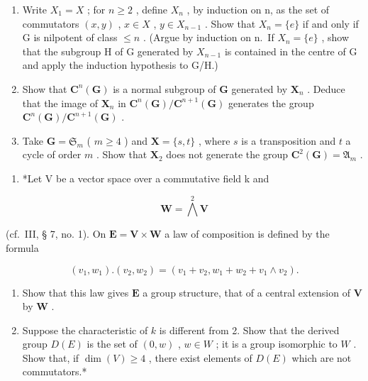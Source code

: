 \begin{enumerate}
\def\labelenumi{(\alph{enumi})}
\item
  Write \(X_{1} = X\) ; for \(n \geqslant 2\) , define \(X_{n}\) , by induction on n, as the set of commutators \((x, y)\) , \(x \in X\) , \(y \in X_{n-1}\) . Show that \(X_{n} = \{e\}\) if and only if G is nilpotent of class \(\leqslant n\) . (Argue by induction on n.~If \(X_{n} = \{e\}\) , show that the subgroup H of G generated by \(X_{n-1}\) is contained in the centre of G and apply the induction hypothesis to G/H.)
\item
  Show that \(\mathbf{C}^n (\mathbf{G})\) is a normal subgroup of \(\mathbf{G}\) generated by \(\mathbf{X}_n\) . Deduce that the image of \(\mathbf{X}_n\) in \(\mathbf{C}^n (\mathbf{G}) / \mathbf{C}^{n + 1}(\mathbf{G})\) generates the group \(\mathbf{C}^n (\mathbf{G}) / \mathbf{C}^{n + 1}(\mathbf{G})\) .
\item
  Take \(\mathbf{G} = \mathfrak{S}_m\) ( \(m \geqslant 4\) ) and \(\mathbf{X} = \{s, t\}\) , where \(s\) is a transposition and \(t\) a cycle of order \(m\) . Show that \(\mathbf{X}_2\) does not generate the group \(\mathbf{C}^2(\mathbf{G}) = \mathfrak{A}_m\) .
\end{enumerate}

\begin{enumerate}
\def\labelenumi{\arabic{enumi}.}
\setcounter{enumi}{15}
\tightlist
\item
  *Let V be a vector space over a commutative field k and
\end{enumerate}

\[
\mathbf {W} = \bigwedge^ {2} \mathbf {V}
\]

(cf.~III, § 7, no. 1). On \(\mathbf{E} = \mathbf{V} \times \mathbf{W}\) a law of composition is defined by the formula

\[
(v _ {1}, w _ {1}). (v _ {2}, w _ {2}) = (v _ {1} + v _ {2}, w _ {1} + w _ {2} + v _ {1} \wedge v _ {2}).
\]

\begin{enumerate}
\def\labelenumi{(\alph{enumi})}
\item
  Show that this law gives \(\mathbf{E}\) a group structure, that of a central extension of \(\mathbf{V}\) by \(\mathbf{W}\) .
\item
  Suppose the characteristic of \(k\) is different from 2. Show that the derived group \(D(E)\) is the set of \((0, w)\) , \(w \in W\) ; it is a group isomorphic to \(W\) . Show that, if \(\dim(V) \geqslant 4\) , there exist elements of \(D(E)\) which are not commutators.*
\end{enumerate}

